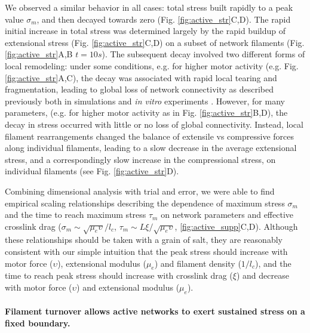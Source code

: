 We observed a similar behavior in all cases: total stress built rapidly to a peak value $\sigma_m$, and then decayed towards zero (Fig. \ref{fig:active_str}C,D).  The rapid initial increase in total stress was determined largely by the rapid buildup of extensional stress (Fig. \ref{fig:active_str}C,D) on a subset of network filaments (Fig. \ref{fig:active_str}A,B $t=10s$). The subsequent decay involved two different forms of local remodeling: under some conditions, e.g. for higher motor activity (e.g. Fig. \ref{fig:active_str}A,C), the decay was associated with rapid local tearing and fragmentation, leading to global loss of network connectivity as described previously both in simulations\cite{Mak:2016aa} and {\em in vitro}  experiments \cite{Alvarado:2013aa}.  However, for many parameters, (e.g. for higher motor activity  as in Fig. \ref{fig:active_str}B,D), the decay in stress occurred with little or no loss of global connectivity.  Instead, local filament rearrangements changed the balance of extensile vs compressive forces along individual filaments, leading to a slow decrease in the average extensional stress, and a correspondingly slow increase in the compressional stress, on individual filaments (see Fig. \ref{fig:active_str}D).  

Combining dimensional analysis with trial and error, we were able to find empirical scaling relationships describing the dependence of maximum stress $\sigma_m$ and the time to reach maximum stress $\tau_m$ on network parameters and effective crosslink drag  ($\sigma_m \sim \sqrt{\mu_e\upsilon}/l_c$, $\tau_m\sim L\xi/\sqrt{\mu_e\upsilon}$, \ref{fig:active_supp}C,D). Although these relationships should be taken with a grain of salt, they are reasonably consistent with our simple intuition that the peak stress should increase with motor force ($\upsilon$), extensional modulus ($\mu_e$) and filament density ($1/l_c$), and the time to reach peak stress should increase with crosslink drag ($\xi$) and decrease with motor force ($\upsilon$) and extensional modulus ($\mu_e$).  

\paragraph{Filament turnover allows active networks to exert sustained stress on a fixed boundary.}

